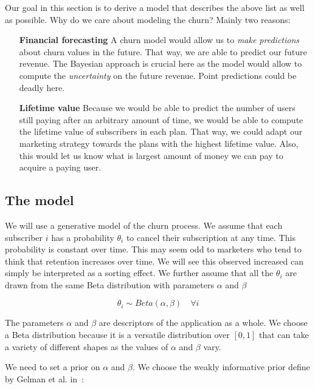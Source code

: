 \documentclass{tufte-book}
\begin{document}
Our goal in this section is to derive a model that describes the above list as well as possible. Why do we
care about modeling the churn? Mainly two reasons:

\begin{itemize}
  \item[\textbf{Financial forecasting}] A churn model would allow us to \textit{make predictions} about churn
    values in the future. That way, we are able to predict our future revenue. The Bayesian approach is
    crucial here as the model would allow to compute the \textit{uncertainty} on the future revenue. Point 
    predictions could be deadly here.
  \item[\textbf{Lifetime value}] Because we would be able to predict the number of users still paying after an
    arbitrary amount of time, we would be able to compute the lifetime value of subscribers in each plan. That
    way, we could adapt our marketing strategy towards the plans with the highest lifetime value. Also, this
    would let us know what is largest amount of money we can pay to acquire a paying user.
\end{itemize}

    \subsection{The model}%
    \label{sub:the_model}
 
We will use a generative model of the churn process. We assume that each subscriber $i$ has a probability
$\theta_i$ to cancel their subscription at any time. This probability is constant over time. This may seem odd
to marketers who tend to think that retention increases over time. We will see this observed increased can
simply be interpreted as a sorting effect.
We further assume that all the $\theta_i$ are drawn from the same Beta distribution with parameters $\alpha$
and $\beta$

\begin{equation}
  \theta_i \sim Beta(\alpha, \beta) \quad \forall i
\end{equation}

The parameters $\alpha$ and $\beta$ are descriptors of the application as a whole. We choose a Beta
distribution because it is a versatile distribution over $\left[0,1\right]$ that can take a variety of
different shapes as the values of $\alpha$ and $\beta$ vary.

We need to set a prior on $\alpha$ and $\beta$. We choose the weakly informative prior define by Gelman et al.
in~\cite{Gelman2014}:
\end{document}
